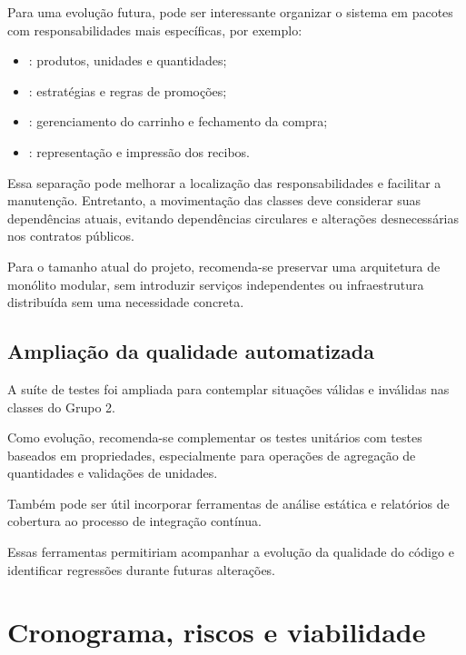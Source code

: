 Para uma evolução futura, pode ser interessante organizar o sistema em pacotes com responsabilidades mais específicas, por exemplo:

\begin{itemize}

\item {}: produtos, unidades e quantidades;

\item {}: estratégias e regras de promoções;

\item {}: gerenciamento do carrinho e fechamento da compra;

\item {}: representação e impressão dos recibos.

\end{itemize}

Essa separação pode melhorar a localização das responsabilidades e facilitar a manutenção. Entretanto, a movimentação das classes deve considerar suas dependências atuais, evitando dependências circulares e alterações desnecessárias nos contratos públicos.

Para o tamanho atual do projeto, recomenda-se preservar uma arquitetura de monólito modular, sem introduzir serviços independentes ou infraestrutura distribuída sem uma necessidade concreta.

\subsection{Ampliação da qualidade automatizada}

A suíte de testes foi ampliada para contemplar situações válidas e inválidas nas classes do Grupo 2.

Como evolução, recomenda-se complementar os testes unitários com testes baseados em propriedades, especialmente para operações de agregação de quantidades e validações de unidades.

Também pode ser útil incorporar ferramentas de análise estática e relatórios de cobertura ao processo de integração contínua.

Essas ferramentas permitiriam acompanhar a evolução da qualidade do código e identificar regressões durante futuras alterações.

\section{Cronograma, riscos e viabilidade}

